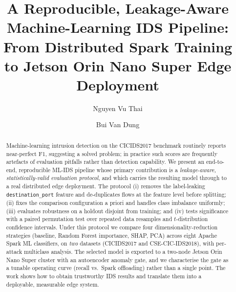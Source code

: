 \documentclass[runningheads]{llncs}
\begin{document}
\title{A Reproducible, Leakage-Aware Machine-Learning IDS Pipeline: From Distributed Spark Training to Jetson Orin Nano Super Edge Deployment}

\author{Nguyen Vu Thai \and Bui Van Dung}

\maketitle

\begin{abstract}
Machine-learning intrusion detection on the CICIDS2017 benchmark routinely reports near-perfect F1, suggesting a solved problem; in practice such scores are frequently artefacts of evaluation pitfalls rather than detection capability. We present an end-to-end, reproducible ML-IDS pipeline whose primary contribution is a \emph{leakage-aware, statistically-valid evaluation protocol}, and which carries the resulting model through to a real distributed edge deployment. The protocol (i) removes the label-leaking \texttt{destination\_port} feature and de-duplicates flows at the feature level before splitting; (ii) fixes the comparison configuration a priori and handles class imbalance uniformly; (iii) evaluates robustness on a holdout disjoint from training; and (iv) tests significance with a paired permutation test over repeated data resamples and $t$-distribution confidence intervals. Under this protocol we compare four dimensionality-reduction strategies (baseline, Random Forest importance, SHAP, PCA) across eight Apache Spark ML classifiers, on \emph{two} datasets (CICIDS2017 and CSE-CIC-IDS2018), with per-attack multiclass analysis. The selected model is exported to a two-node Jetson Orin Nano Super cluster with an autoencoder anomaly gate, and we characterise the gate as a tunable operating curve (recall vs.\ Spark offloading) rather than a single point. The work shows how to obtain trustworthy IDS results and translate them into a deployable, measurable edge system.
\end{abstract}
\end{document}
